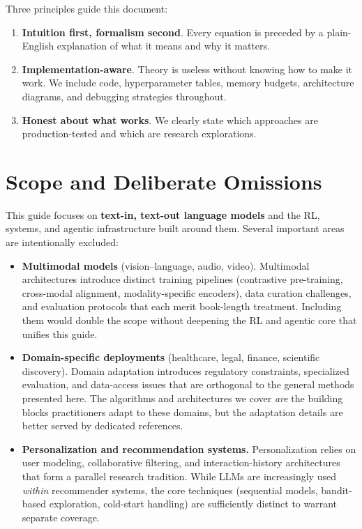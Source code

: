 \documentclass[11pt,a4paper,openany]{book}
\begin{document}
Three principles guide this document:

\begin{enumerate}
  \item \textbf{Intuition first, formalism second}. Every equation is preceded by a plain-English explanation of what it means and why it matters.
  \item \textbf{Implementation-aware}. Theory is useless without knowing how to make it work. We include code, hyperparameter tables, memory budgets, architecture diagrams, and debugging strategies throughout.
  \item \textbf{Honest about what works}. We clearly state which approaches are production-tested and which are research explorations.
\end{enumerate}

\section*{Scope and Deliberate Omissions}
\label{scope-and-deliberate-omissions}

This guide focuses on \textbf{text-in, text-out language models} and the RL, systems, and agentic infrastructure built around them. Several important areas are intentionally excluded:

\begin{itemize}
  \item \textbf{Multimodal models} (vision--language, audio, video). Multimodal architectures introduce distinct training pipelines (contrastive pre-training, cross-modal alignment, modality-specific encoders), data curation challenges, and evaluation protocols that each merit book-length treatment. Including them would double the scope without deepening the RL and agentic core that unifies this guide.
  \item \textbf{Domain-specific deployments} (healthcare, legal, finance, scientific discovery). Domain adaptation introduces regulatory constraints, specialized evaluation, and data-access issues that are orthogonal to the general methods presented here. The algorithms and architectures we cover \emph{are} the building blocks practitioners adapt to these domains, but the adaptation details are better served by dedicated references.
  \item \textbf{Personalization and recommendation systems.} Personalization relies on user modeling, collaborative filtering, and interaction-history architectures that form a parallel research tradition. While LLMs are increasingly used \emph{within} recommender systems, the core techniques (sequential models, bandit-based exploration, cold-start handling) are sufficiently distinct to warrant separate coverage.
\end{itemize}
\end{document}
